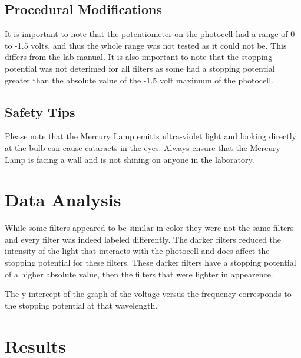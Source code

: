 \documentclass[a4paper]{article}
\begin{document}
\subsection{Procedural Modifications}

\qq It is important to note that the potentiometer on the photocell
had a range of 0 to -1.5 volts, and thus the whole range was not
tested as it could not be. This differs from the lab manual. It is
also important to note that the stopping potential was not deterimed
for all filters as some had a stopping potential greater than the
absolute value of the -1.5 volt maximum of the photocell.

\subsection{Safety Tips}

\qq Please note that the Mercury Lamp emitts ultra-violet light and
looking directly at the bulb can cause cataracts in the eyes. Always
ensure that the Mercury Lamp is facing a wall and is not shining on
anyone in the laboratory.


\section{Data Analysis}


\qq While some filters appeared to be similar in color they were not
the same filters and every filter was indeed labeled differently. The
darker filters reduced the intensity of the light that interacts with
the photocell and does affect the stopping potential for these
filters. These darker filters have a stopping potential of a higher
absolute value, then the filters that were lighter in appearence. 


\qq The y-intercept of the graph of the voltage versus the
frequency corresponds to the stopping potential at that wavelength. 
 

\section{Results}

\end{document}
